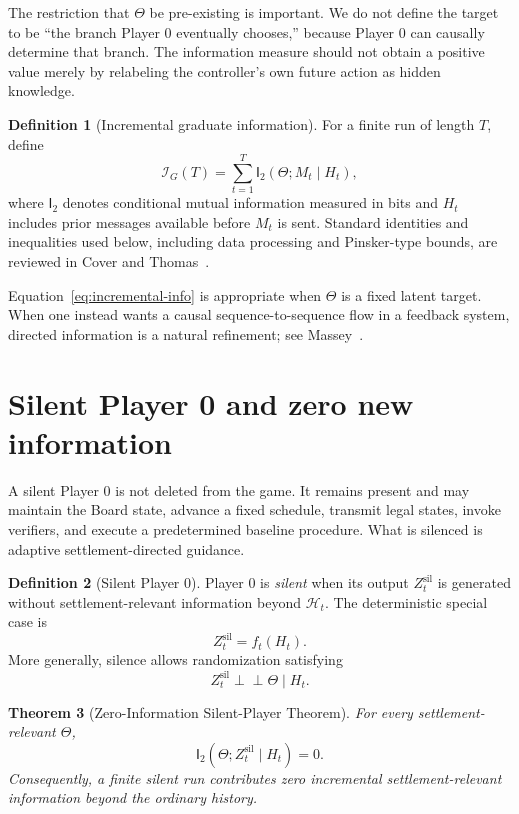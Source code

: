 \documentclass[11pt]{article}
\newtheorem{theorem}{Theorem}[section]
\theoremstyle{definition}
\newtheorem{definition}[theorem]{Definition}
\newcommand{\I}{\mathsf{I}}
\newcommand{\sil}{\mathrm{sil}}
\begin{document}
The restriction that $\Theta$ be pre-existing is important.  We do not define the target to be ``the branch Player 0 eventually chooses,'' because Player 0 can causally determine that branch.  The information measure should not obtain a positive value merely by relabeling the controller's own future action as hidden knowledge.

\begin{definition}[Incremental graduate information]
For a finite run of length $T$, define
\begin{equation}
\mathcal I_G(T)
=
\sum_{t=1}^{T}
\I_2(\Theta;M_t\mid H_t),
\label{eq:incremental-info}
\end{equation}
where $\I_2$ denotes conditional mutual information measured in bits and $H_t$ includes prior messages available before $M_t$ is sent.  Standard identities and inequalities used below, including data processing and Pinsker-type bounds, are reviewed in Cover and Thomas~\cite{coverthomas}.
\end{definition}

Equation~\eqref{eq:incremental-info} is appropriate when $\Theta$ is a fixed latent target.  When one instead wants a causal sequence-to-sequence flow in a feedback system, directed information is a natural refinement; see Massey~\cite{massey1990}.

\section{Silent Player 0 and zero new information}

A silent Player 0 is not deleted from the game.  It remains present and may maintain the Board state, advance a fixed schedule, transmit legal states, invoke verifiers, and execute a predetermined baseline procedure.  What is silenced is adaptive settlement-directed guidance.

\begin{definition}[Silent Player 0]
Player 0 is \emph{silent} when its output $Z_t^{\sil}$ is generated without settlement-relevant information beyond $\mathscr H_t$.  The deterministic special case is
\[
Z_t^{\sil}=f_t(H_t).
\]
More generally, silence allows randomization satisfying
\[
Z_t^{\sil}\perp\!\!\!\perp \Theta\mid H_t.
\]
\end{definition}

\begin{theorem}[Zero-Information Silent-Player Theorem]
For every settlement-relevant $\Theta$,
\[
\I_2(\Theta;Z_t^{\sil}\mid H_t)=0.
\]
Consequently, a finite silent run contributes zero incremental settlement-relevant information beyond the ordinary history.
\end{theorem}
\end{document}
